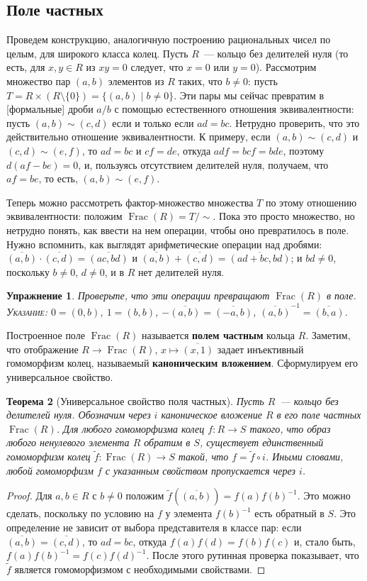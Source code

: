 \documentclass[a4paper,11pt]{scrartcl}
\theoremstyle{plain}
\newtheorem{theorem}{Теорема}[subsection]
\newtheorem{exercise}[theorem]{Упражнение}
\theoremstyle{definition}
\newcommand\dfn[1]{\textbf{#1}}
\newcommand\wt{\widetilde}
\newcommand\Frac{\operatorname{Frac}}
\begin{document}
\subsection{Поле частных}

Проведем конструкцию, аналогичную построению рациональных чисел по
целым, для широкого класса колец.
Пусть $R$~--- кольцо без делителей нуля (то есть, для $x,y\in R$ из
$xy=0$ следует, что $x=0$ или $y=0$). Рассмотрим множество пар
$(a,b)$ элементов из $R$ таких, что $b\neq 0$: пусть $T=R\times
(R\setminus\{0\})=\{(a,b)\mid b\neq 0\}$. Эти пары мы сейчас превратим
в [формальные] дроби $a/b$ с помощью естественного отношения
эквивалентности: пусть $(a,b)\sim (c,d)$ если и только если
$ad=bc$. Нетрудно проверить, что это действительно отношение
эквивалентности. К примеру, если $(a,b)\sim (c,d)$ и $(c,d)\sim
(e,f)$, то $ad=bc$ и $cf=de$, откуда $adf=bcf=bde$, поэтому
$d(af-be)=0$, и, пользуясь отсутствием делителей нуля, получаем, что
$af=be$, то есть, $(a,b)\sim (e,f)$.

Теперь можно рассмотреть фактор-множество множества $T$ по этому
отношению эквивалентности: положим $\Frac(R)=T/\sim$. Пока это просто
множество, но нетрудно понять, как ввести на нем операции, чтобы оно
превратилось в поле. Нужно вспомнить, как выглядят арифметические
операции над дробями:
$\overline{(a,b)}\cdot\overline{(c,d)}=\overline{(ac,bd)}$ и
$\overline{(a,b)}+\overline{(c,d)}=\overline{(ad+bc,bd)}$; и $bd\neq
0$, поскольку $b\neq 0$, $d\neq 0$, и в $R$ нет делителей нуля.

\begin{exercise}
Проверьте, что эти операции превращают $\Frac(R)$ в поле.
\textsc{Указание:} $0=(0,b)$, $1=(b,b)$,
$-\overline{(a,b)}=\overline{(-a,b)}$,
$\overline{(a,b)}^{-1}=\overline{(b,a)}$.
\end{exercise}

Построенное поле $\Frac(R)$ называется \dfn{полем частным} кольца
$R$. Заметим, что отображение $R\to\Frac(R)$, $x\mapsto
\overline{(x,1)}$ задает инъективный гомоморфизм колец, называемый
\dfn{каноническим вложением}. Сформулируем
его универсальное свойство.

\begin{theorem}[Универсальное свойство поля частных]
Пусть $R$~--- кольцо без делителей нуля. Обозначим через $i$
каноническое вложение $R$ в его поле частных $\Frac(R)$. Для любого
гомоморфизма колец $f\colon R\to S$ такого, что образ любого
ненулевого элемента $R$ обратим в $S$, существует единственный
гомоморфизм колец $\wt{f}\colon\Frac(R)\to S$ такой, что
$f=\wt{f}\circ i$. Иными словами, любой гомоморфизм $f$ с указанным
свойством пропускается через $i$.
\end{theorem}
\begin{proof}
Для $a,b\in R$ с $b\neq 0$ положим
$\wt{f}(\overline{(a,b)})=f(a)f(b)^{-1}$. Это можно сделать,
поскольку по условию на $f$ у элемента $f(b)^{-1}$ есть обратный в
$S$. Это определение не зависит от выбора представителя в классе пар:
если $\overline{(a,b)}=\overline{(c,d)}$, то $ad=bc$, откуда
$f(a)f(d)=f(b)f(c)$ и, стало быть,
$f(a)f(b)^{-1}=f(c)f(d)^{-1}$. После этого рутинная проверка
показывает, что $\wt{f}$ является гомоморфизмом с необходимыми
свойствами.
\end{proof}
\end{document}
